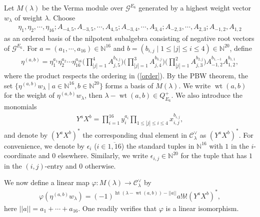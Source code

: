 \documentclass[12pt]{article}
\numberwithin{equation}{section}
\theoremstyle{definition}
\theoremstyle{remark}
\begin{document}
Let $M(\lambda)$ be the Verma module over $\mathscr{G}^{E_6}$ generated by a highest weight vector $w_{\lambda}$ of weight $\lambda$. Choose 
\begin{eqnarray}
	\eta_1, \eta_2, \cdots, \eta_{16}; A_{-4,5}, A_{-3,5}, \cdots, A_{4,5}; A_{-3,4}, \cdots, A_{3,4}; A_{-2,3}, \cdots, A_{2,3}; A_{-1,2}, A_{1,2} \label{order}
\end{eqnarray}
as an ordered basis of the nilpotent subalgebra consisting of negative root vectors of $\mathscr{G}^{E_6}$.
For $a=(a_1,\cdots,a_{16})\in\mathbb{N}^{16}$ and $b=(b_{i,j}\mid 1\leqslant |j|\leqslant i\leqslant 4)\in\mathbb{N}^{20}$, define
\begin{eqnarray}
	\eta^{(a,b)}=\eta_1^{a_1}\eta_2^{a_2}\cdots\eta_{16}^{a_{16}}\big(\prod_{|j|=1}^4A_{j,5}^{b_{4,j}}\big)\big(\prod_{|j|=1}^3A_{j,4}^{b_{3,j}}\big)\big(\prod_{|j|=1}^2A_{j,3}^{b_{2,j}}\big)A_{-1,2}^{b_{1,-1}}A_{1,2}^{b_{1,1}},
\end{eqnarray}
where the product respects the ordering in (\ref{order}).
By the PBW theorem, the set $\{\eta^{(a,b)}w_{\lambda}\mid a\in\mathbb{N}^{16}, b\in\mathbb{N}^{20}\}$ forms a basis of $M(\lambda)$. We write $\operatorname{wt}(a,b)$ for the weight of $\eta^{(a,b)}w_{\lambda}$, then $\lambda-\operatorname{wt}(a,b)\in Q_{E_6}^+$. We also introduce the monomials
\begin{eqnarray}
	Y^aX^b=\prod_{i=1}^{16}y_i^{a_i}\prod_{1\leqslant |j|\leqslant i\leqslant 4}x_{i,j}^{b_{i,j}},
\end{eqnarray}
and denote by $(Y^aX^b)^*$ the corresponding dual element in $\mathscr{C}_{\lambda}^{\vee}$ as $(Y^aX^b)^*$. For convenience, we denote by $\epsilon_i$ ($i\in\overline{1,16}$) the standard tuples in $\mathbb{N}^{16}$ with
$1$ in the $i$-coordinate and $0$ elsewhere. Similarly, we write $\epsilon_{i,j}\in\mathbb{N}^{20}$ for the tuple that has $1$ in the $(i,j)$-entry and $0$ otherwise.

We now define a linear map $\varphi:M(\lambda)\longrightarrow\mathscr{C}_{\lambda}^{\vee}$ by
\begin{align}
	\varphi(\eta^{(a,b)}w_{\lambda})=(-1)^{\operatorname{ht}(\lambda-\operatorname{wt}(a,b))-||a||}a!b!(Y^{a}X^b)^*,
\end{align}
here $||a||=a_1+\cdots+a_{16}$.
One readily verifies that $\varphi$ is a linear isomorphism.
\end{document}
